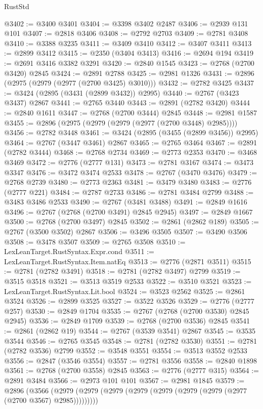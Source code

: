 \begin{lexlean}{RustStd}
\begin{coremodule}
@3402 := @3400 @3401
@3404 := @3398 @3402 @2487
@3406 := @2939 @131 @101
@3407 := @2818 @3406
@3408 := @2792 @2703
@3409 := @2781 @3408
@3410 := @3388 @3235
@3411 := @3409 @3410
@3412 := @3407 @3411
@3413 := @2899 @3412
@3415 := @2350 (@3404 @3413)
@3416 := @2694 @194
@3419 := @2691 @3416 @3382 @3291
@3420 := @2840 @1545
@3423 := @2768 (@2700 @3420) @2845
@3424 := @2891 @2788
@3425 := @2981 @1326
@3431 := @2896 (@2975 (@2979 (@2977 (@2700 @3425) @3010)))
@3432 := @2782 @3425
@3437 := @3424 (@2895 (@3431 (@2899 @3432)) @2995)
@3440 := @2767 (@3423 @3437) @2867
@3441 := @2765 @3440
@3443 := @2891 (@2782 @3420)
@3444 := @2840 @1611
@3447 := @2768 (@2700 @3444) @2845
@3448 := @2981 @1587
@3455 := @2896 (@2975 (@2979 (@2979 (@2977 (@2700 @3448) @2985))))
@3456 := @2782 @3448
@3461 := @3424 (@2895 (@3455 (@2899 @3456)) @2995)
@3464 := @2767 (@3447 @3461) @2867
@3465 := @2765 @3464
@3467 := @2891 (@2782 @3444)
@3468 := @2768 @2734
@3469 := @2773 @2353
@3470 := @3468 @3469
@3472 := @2776 (@2777 @131)
@3473 := @2781 @3167
@3474 := @3473 @3347
@3476 := @3472 @3474 @2533
@3478 := @2767 (@3470 @3476)
@3479 := @2768 @2739
@3480 := @2773 @2363
@3481 := @3479 @3480
@3483 := @2776 (@2777 @221)
@3484 := @2787 @2733
@3486 := @2781 @3484 @2799
@3488 := @3483 @3486 @2533
@3490 := @2767 (@3481 @3488)
@3491 := @2849 @1616
@3496 := @2767 (@2768 (@2700 @3491) @2845 @2945)
@3497 := @2849 @1667
@3500 := @2768 (@2700 @3497) @2845
@3502 := @2861 (@2862 @189)
@3505 := @2767 (@3500 @3502) @2867
@3506 := @3496 @3505
@3507 := @3490 @3506
@3508 := @3478 @3507
@3509 := @2765 @3508
@3510 := LexLeanTarget.RustSyntax.Expr.cond
@3511 := LexLeanTarget.RustSyntax.Item.natEq
@3513 := @2776 (@2871 @3511)
@3515 := @2781 (@2782 @3491)
@3518 := @2781 (@2782 @3497) @2799
@3519 := @3515 @3518
@3521 := @3513 @3519 @2533
@3522 := @3510 @3521
@3523 := LexLeanTarget.RustSyntax.Lit.bool
@3524 := @3523 @2562
@3525 := @2861 @3524
@3526 := @2899 @3525
@3527 := @3522 @3526
@3529 := @2776 (@2777 @257)
@3530 := @2849 @1704
@3535 := @2767 (@2768 (@2700 @3530) @2845 @2945)
@3536 := @2849 @1709
@3539 := @2768 (@2700 @3536) @2845
@3541 := @2861 (@2862 @19)
@3544 := @2767 (@3539 @3541) @2867
@3545 := @3535 @3544
@3546 := @2765 @3545
@3548 := @2781 (@2782 @3530)
@3551 := @2781 (@2782 @3536) @2799
@3552 := @3548 @3551
@3554 := @3513 @3552 @2533
@3556 := @2847 (@3546 @3554)
@3557 := @2781 @3556
@3558 := @2840 @1898
@3561 := @2768 (@2700 @3558) @2845
@3563 := @2776 (@2777 @315)
@3564 := @2891 @3484
@3566 := @2973 @101 @101
@3567 := @2981 @1845
@3579 := @2896
    (@3566 (@2979 (@2979 (@2979 (@2979 (@2979 (@2979 (@2979 (@2977 (@2700 @3567) @2985)))))))))

\end{coremodule}
\end{lexlean}
